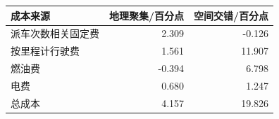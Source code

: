 \begin{tabular}{lrr}
\toprule
成本来源 & 地理聚集/百分点 & 空间交错/百分点 \\
\midrule
派车次数相关固定费 & 2.309 & -0.126 \\
按里程计行驶费 & 1.561 & 11.907 \\
燃油费 & -0.394 & 6.798 \\
电费 & 0.680 & 1.247 \\
总成本 & 4.157 & 19.826 \\
\bottomrule
\end{tabular}
